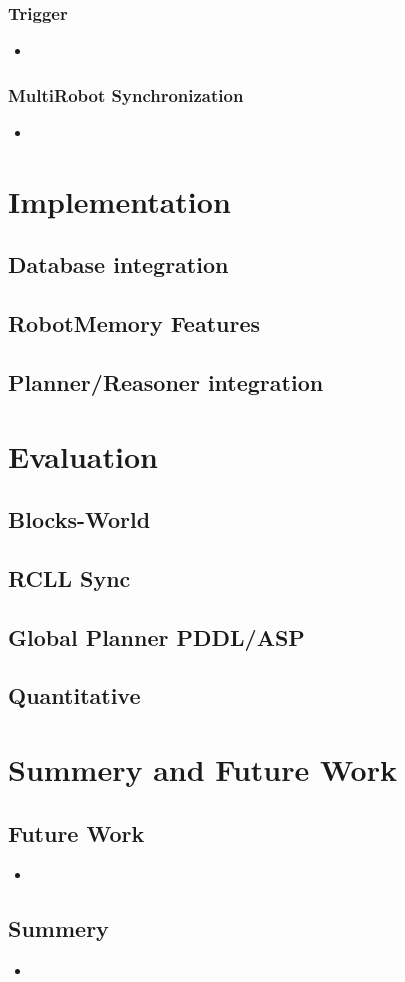 \documentclass[a4paper,11pt]{article}
\begin{document}
\subsubsection{Trigger}
\begin{itemize}
\item 
\end{itemize}
\subsubsection{MultiRobot Synchronization}
\begin{itemize}
\item 
\end{itemize}


\section{Implementation}
\subsection{Database integration}
\subsection{RobotMemory Features}
\subsection{Planner/Reasoner integration}


\section{Evaluation}
\subsection{Blocks-World}
\subsection{RCLL Sync}
\subsection{Global Planner PDDL/ASP}
\subsection{Quantitative}


\section{Summery and Future Work}
\subsection{Future Work}
\begin{itemize}
\item 
\end{itemize}
\subsection{Summery}
\begin{itemize}
\item 
\end{itemize}



\end{document}
